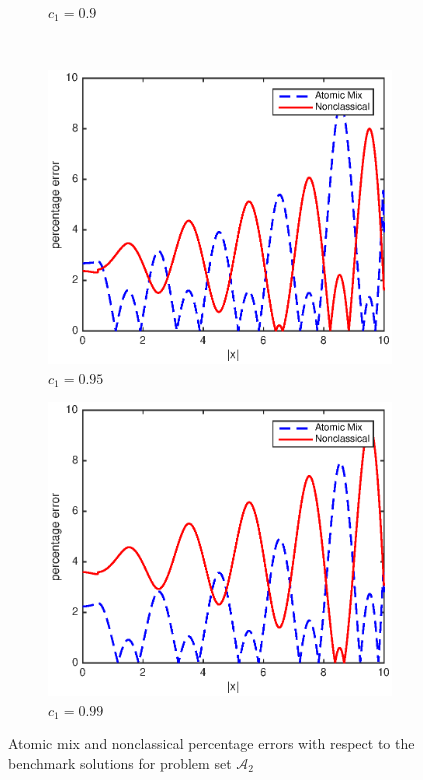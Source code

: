 \documentclass[12pt]{article}
\newcommand{\seta}{\mathcal{A}}
\begin{document}
{\begin{figure}[p]
\begin{subfigure}{0.495\textwidth}
        \caption{$c_1 = 0.9$}
        \label{figerrB90}
    \end{subfigure}
    \\
    \centering
    \begin{subfigure}{0.495\textwidth}
        \centering
        \includegraphics[width=\textwidth]{NSE_err_B95.eps}
        \caption{$c_1 = 0.95$}
        \label{figerrB95}
    \end{subfigure}
    \hfill
    \begin{subfigure}{0.495\textwidth}
        \centering
        \includegraphics[width=\textwidth]{NSE_err_B99.eps}
        \caption{$c_1 = 0.99$}
        \label{figerrB99}
    \end{subfigure}
    \caption{Atomic mix and nonclassical percentage errors with respect to the benchmark solutions for problem set $\seta_2$}
    \label{figerrB2}
\end{figure}





}
\end{document}
